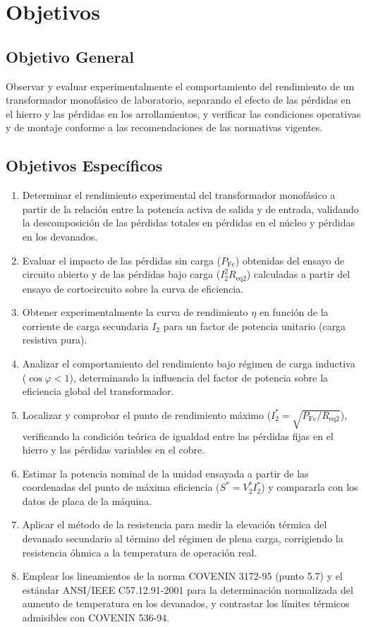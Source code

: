 \section{Objetivos}

\subsection{Objetivo General}
Observar y evaluar experimentalmente el comportamiento del rendimiento de un transformador monofásico de laboratorio, separando el efecto de las pérdidas en el hierro y las pérdidas en los arrollamientos, y verificar las condiciones operativas y de montaje conforme a las recomendaciones de las normativas vigentes.

\subsection{Objetivos Específicos}
\begin{enumerate}
    \item Determinar el rendimiento experimental del transformador monofásico a partir de la relación entre la potencia activa de salida y de entrada, validando la descomposición de las pérdidas totales en pérdidas en el núcleo y pérdidas en los devanados.
    \item Evaluar el impacto de las pérdidas sin carga ($P_{\text{Fe}}$) obtenidas del ensayo de circuito abierto y de las pérdidas bajo carga ($I_2^2 R_{\text{eq2}}$) calculadas a partir del ensayo de cortocircuito sobre la curva de eficiencia.
    \item Obtener experimentalmente la curva de rendimiento $\eta$ en función de la corriente de carga secundaria $I_2$ para un factor de potencia unitario (carga resistiva pura).
    \item Analizar el comportamiento del rendimiento bajo régimen de carga inductiva ($\cos\varphi < 1$), determinando la influencia del factor de potencia sobre la eficiencia global del transformador.
    \item Localizar y comprobar el punto de rendimiento máximo ($I_2^* = \sqrt{P_{\text{Fe}}/R_{\text{eq2}}}$), verificando la condición teórica de igualdad entre las pérdidas fijas en el hierro y las pérdidas variables en el cobre.
    \item Estimar la potencia nominal de la unidad ensayada a partir de las coordenadas del punto de máxima eficiencia ($S^* = V_2^* I_2^*$) y compararla con los datos de placa de la máquina.
    \item Aplicar el método de la resistencia para medir la elevación térmica del devanado secundario al término del régimen de plena carga, corrigiendo la resistencia óhmica a la temperatura de operación real.
    \item Emplear los lineamientos de la norma COVENIN 3172-95 (punto 5.7) y el estándar ANSI/IEEE C57.12.91-2001 para la determinación normalizada del aumento de temperatura en los devanados, y contrastar los límites térmicos admisibles con COVENIN 536-94.
\end{enumerate}
